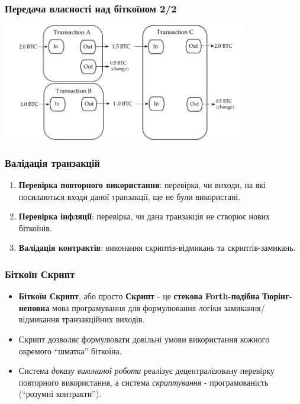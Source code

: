 \documentclass{beamer}
\begin{document}
\begin{frame}[fragile]
  \frametitle{Передача власності над біткоїном 2/2}
  \begin{center}
    \includegraphics[width=0.8\textwidth]{transactions}
  \end{center}
\end{frame}

\begin{frame}[fragile]
  \frametitle{Валідація транзакцій}
  \begin{enumerate}
  \item \textbf{Перевірка повторного використання}: перевірка, чи виходи, на які
    посилаються входи даної транзакції, ще не були використані.
  \item \textbf{Перевірка інфляції}: перевірка, чи дана транзакція не створює
    нових біткоїнів.
  \item \textbf{Валідація контрактів}: виконання скриптів-відмикань та
    скриптів-замикань.
  \end{enumerate}
\end{frame}

\begin{frame}[fragile]
  \frametitle{Біткоїн Скрипт}
  \begin{itemize}
  \item \textbf{Біткоїн Скрипт}, або просто \textbf{Скрипт} - це
    \textbf{стекова} \textbf{Forth-подібна} \textbf{Тюрінг-неповна} мова програмування
    для формулювання логіки замикання/відмикання транзакційних виходів.
  \item Скрипт дозволяє формулювати довільні умови використання кожного окремого
    ``шматка'' біткоїна.
  \item Система \textit{доказу виконаної роботи} реалізує децентралізовану
    перевірку повторного використання, а система \textit{скриптування} -
    програмованість (``розумні контракти'').
  \end{itemize}
\end{frame}
\end{document}
